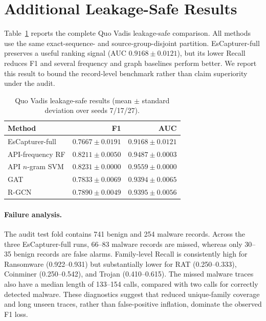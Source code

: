 
\section{Additional Leakage-Safe Results}
\label{sec:appendix-leakage-safe}

Table~\ref{tab:appendix-rq1-audit} reports the complete Quo Vadis
leakage-safe comparison.  All methods use the same exact-sequence- and
source-group-disjoint partition.  EsCapturer-full preserves a useful ranking
signal (AUC $0.9168{\pm}0.0121$), but its lower Recall reduces F1 and several
frequency and graph baselines perform better.  We report this result to bound
the record-level benchmark rather than claim superiority under the audit.

\begin{table}[!t]
\caption{Quo Vadis leakage-safe results (mean $\pm$ standard deviation over
seeds 7/17/27).}
\label{tab:appendix-rq1-audit}
\centering
\scriptsize
\setlength{\tabcolsep}{4pt}
\begin{tabular}{lrr}
\hline
Method & F1 & AUC \\
\hline
EsCapturer-full & $0.7667{\pm}0.0191$ & $0.9168{\pm}0.0121$ \\
API-frequency RF & $0.8211{\pm}0.0050$ & $0.9487{\pm}0.0003$ \\
API $n$-gram SVM & $0.8231{\pm}0.0000$ & $0.9559{\pm}0.0000$ \\
GAT & $0.7833{\pm}0.0069$ & $0.9394{\pm}0.0065$ \\
R-GCN & $0.7890{\pm}0.0049$ & $0.9395{\pm}0.0056$ \\
\hline
\end{tabular}
\end{table}

\paragraph{Failure analysis.}
The audit test fold contains 741 benign and 254 malware records.  Across the
three EsCapturer-full runs, 66--83 malware records are missed, whereas only
30--35 benign records are false alarms.  Family-level Recall is consistently
high for Ransomware (0.922--0.931) but substantially lower for RAT
(0.250--0.333), Coinminer (0.250--0.542), and Trojan (0.410--0.615).  The
missed malware traces also have a median length of 133--154 calls, compared
with two calls for correctly detected malware.  These diagnostics suggest
that reduced unique-family coverage and long unseen traces, rather than
false-positive inflation, dominate the observed F1 loss.
